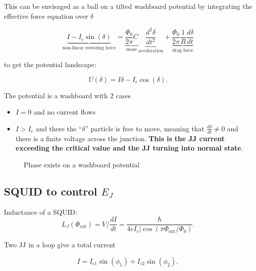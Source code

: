 This can  be envisaged  as a  ball on  a tilted washboard  potential by  integrating the  effective force  equation over
$\delta$

\begin{equation}
  \underbrace{I - I_c\sin(\delta)}_{\text{non-linear restoring force}} = \underbrace{ \frac{\Phi_{0}}{2\pi}C}_{\text{mass}}\underbrace{\frac{d^2\delta}{dt^2}}_{\text{acceleration}} + \underbrace{\frac{\Phi_{0}}{2\pi}\frac{1}{R}\frac{d\delta}{dt}}_{\text{drag force}}
\end{equation}

\noindent to get the potential landscape:

\begin{equation}
  U(\delta) = I\delta - I_c\cos(\delta).
\end{equation}

\noindent The potential is a washboard with 2 cases
\begin{itemize}
\item $I=0$ and no current flows
\item $I>I_c$ and there the ``$\delta$'' particle is free to  move, meaning that $\frac{d\delta}{dt} \ne 0$ and there is a
  finite voltage across  the junction.  \textbf{This is the JJ  current exceeding the critical value and  the JJ turning
    into normal state}.
\end{itemize}

\begin{figure}[h]
  \centering {}
  \caption{\small Phase exists on a washboard potential\label{fig:jj_washboard}}
\end{figure}

\subsection{SQUID to control $ E_J $\cite{zhu2010}}
\begin{framed}\noindent
  Inductance of a SQUID:
  \begin{equation}\label{l2:squid:inductance}
    L_J(\Phi_\text{ext}) = V/\frac{dI}{dt} = \frac{\hbar}{4eI_c|\cos(\pi\Phi_\text{ext}/\Phi_0)}.
  \end{equation}
\end{framed}

Two JJ in a loop give a total current

    \begin{equation}
      I = I_{c1}\sin(\phi_1)+I_{c2}\sin(\phi_2),
    \end{equation}

